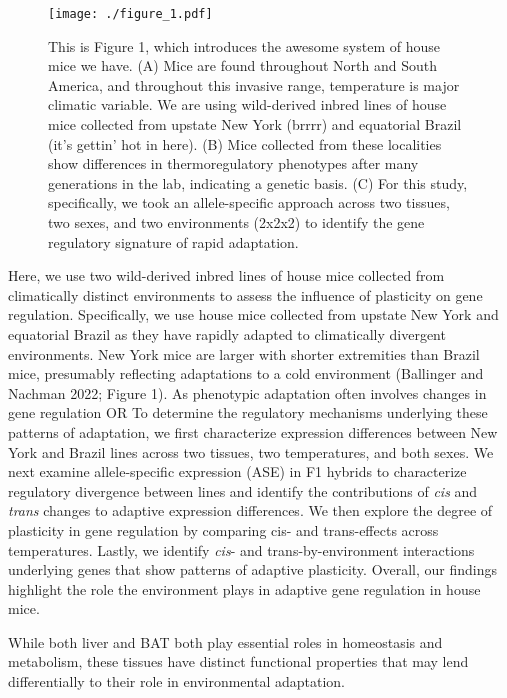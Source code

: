 \documentclass[9pt,twocolumn,twoside,lineno]{pnas-new}
\begin{document}
\begin{figure}[t]
  \texttt{[image: ./figure\_1.pdf]}
  \caption{This is Figure 1, which introduces the awesome system of house mice we have. (A) Mice are found throughout North and South America, and throughout this invasive range, temperature is major climatic variable. We are using wild-derived inbred lines of house mice collected from upstate New York (brrrr) and equatorial Brazil (it's gettin' hot in here). (B) Mice collected from these localities show differences in thermoregulatory phenotypes after many generations in the lab, indicating a genetic basis. (C) For this study, specifically, we took an allele-specific approach across two tissues, two sexes, and two environments (2x2x2) to identify the gene regulatory signature of rapid adaptation.}
\end{figure}

Here, we use two wild-derived inbred lines of house mice collected from
climatically distinct environments to assess the influence of plasticity
on gene regulation. Specifically, we use house mice collected from
upstate New York and equatorial Brazil as they have rapidly adapted to
climatically divergent environments. New York mice are larger with
shorter extremities than Brazil mice, presumably reflecting adaptations
to a cold environment (Ballinger and Nachman 2022; Figure 1). As
phenotypic adaptation often involves changes in gene regulation OR To
determine the regulatory mechanisms underlying these patterns of
adaptation, we first characterize expression differences between New
York and Brazil lines across two tissues, two temperatures, and both
sexes. We next examine allele-specific expression (ASE) in F1 hybrids to
characterize regulatory divergence between lines and identify the
contributions of \emph{cis} and \emph{trans} changes to adaptive
expression differences. We then explore the degree of plasticity in gene
regulation by comparing cis- and trans-effects across temperatures.
Lastly, we identify \emph{cis}- and trans-by-environment interactions
underlying genes that show patterns of adaptive plasticity. Overall, our
findings highlight the role the environment plays in adaptive gene
regulation in house mice.

While both liver and BAT both play essential roles in homeostasis and
metabolism, these tissues have distinct functional properties that may
lend differentially to their role in environmental adaptation.
\end{document}
